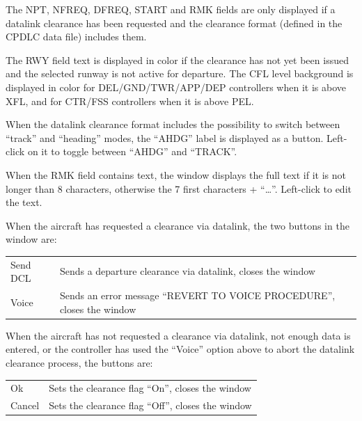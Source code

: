 \documentclass[a4paper,oneside,11pt]{memoir}
\begin{document}
\bigskip

The NPT, NFREQ, DFREQ, START and RMK fields are only displayed if a datalink clearance has been requested and the clearance format (defined in the CPDLC data file) includes them.

\bigskip

The RWY field text is displayed in  color if the clearance has not yet been issued and the selected runway is not active for departure. The CFL level background is displayed in  color for DEL/GND/TWR/APP/DEP controllers when it is above XFL, and for CTR/FSS controllers when it is above PEL.

\bigskip

When the datalink clearance format includes the possibility to switch between “track” and “heading” modes, the “AHDG” label is displayed as a button. Left-click on it to toggle between “AHDG” and “TRACK”.

\bigskip

When the RMK field contains text, the window displays the full text if it is not longer than 8 characters, otherwise the 7 first characters + “…”. Left-click to edit the text.

\bigskip

When the aircraft has requested a clearance via datalink, the two buttons in the window are:

\begin{longtable}{p{2.5cm} p{10cm}}
    Send DCL    & Sends a departure clearance via datalink, closes the window\\
    Voice       & Sends an error message “REVERT TO VOICE PROCEDURE”, closes the window\\
\end{longtable}

\bigskip

When the aircraft has not requested a clearance via datalink, not enough data is entered, or the controller has used the “Voice” option above to abort the datalink clearance process, the buttons are:

\bigskip

\begin{longtable}{p{2.5cm} p{10cm}}
    Ok      & Sets the clearance flag “On”, closes the window\\
    Cancel  & Sets the clearance flag “Off”, closes the window\\
\end{longtable}

\bigskip
\end{document}
